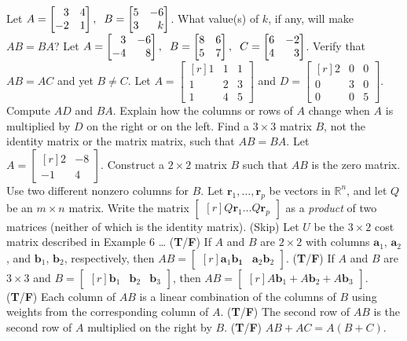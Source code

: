 \documentclass[11pt,answers]{exam} %
\renewcommand{\vec}[1]{\mathbf{#1}}
\newcommand{\mat}[1]{\begin{bmatrix*}[r] #1 \end{bmatrix*}}
\begin{document}
\begin{questions}
    \question Let $A = \mat{3 & 4 \\ -2 & 1}, \hspace{2mm} B=\mat{5 & -6 \\ 3 & k}$. What value(s) of $k$, if any, will make $AB = BA$?
    \question Let $A = \mat{3 & -6 \\ -4 & 8}, \hspace{2mm} B=\mat{8 & 6 \\ 5 & 7}, \hspace{2mm} C = \mat{6 & -2 \\ 4 & 3}$. Verify that $AB = AC$ and yet $B \neq C$.
    \question Let $A = \mat{1 & 1 & 1 \\ 1 & 2 & 3 \\ 1 & 4 & 5}$ and $D = \mat{2 & 0 & 0 \\ 0 & 3 & 0 \\ 0 & 0 & 5}$. Compute $AD$ and $BA$. Explain how the columns or rows of $A$ change when $A$ is multiplied by $D$ on the right or on the left. Find a $3 \times 3$ matrix $B$, not the identity matrix or the matrix matrix, such that $AB = BA$.
    \question Let $A = \mat{2 & -8 \\ -1 & 4}$. Construct a $2 \times 2$ matrix $B$ such that $AB$ is the zero matrix. Use two different nonzero columns for $B$.
    \question Let $\vec{r}_1, \ldots, \vec{r}_p$ be vectors in $\mathbb{R}^n$, and let $Q$ be an $m \times n$ matrix. Write the matrix $\mat{Q\vec{r}_1 \ldots Q\vec{r}_p}$ as a \emph{product} of two matrices (neither of which is the identity matrix).
    \question (Skip) Let $U$ be the $3\times2$ cost matrix described in Example 6 \ldots
    \question (\textbf{T}/\textbf{F}) If $A$ and $B$ are $2 \times 2$ with columns $\vec{a}_1$, $\vec{a}_2$, and $\vec{b}_1$, $\vec{b}_2$, respectively, then $AB = \mat{\vec{a}_1 \vec{b_1} & \vec{a}_2 \vec{b}_2}$.
    \question (\textbf{T}/\textbf{F}) If $A$ and $B$ are $3 \times 3$ and $B = \mat{\vec{b}_1 & \vec{b}_2 & \vec{b}_3}$, then $AB = \mat{A\vec{b}_1 + A\vec{b}_2 + A\vec{b}_3}$.
    \question (\textbf{T}/\textbf{F}) Each column of $AB$ is a linear combination of the columns of $B$ using weights from the corresponding column of $A$.
    \question (\textbf{T}/\textbf{F}) The second row of $AB$ is the second row of $A$ multiplied on the right by $B$.
    \question (\textbf{T}/\textbf{F}) $AB + AC = A\left(B+C\right)$.

\end{questions}
\end{document}
